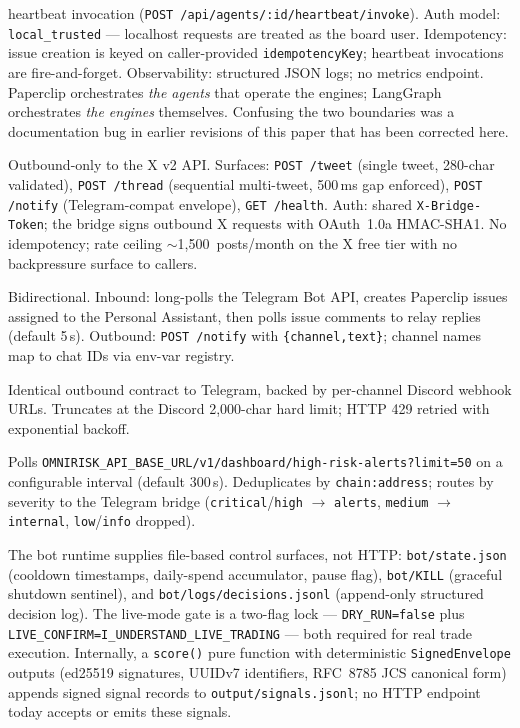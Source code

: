 \documentclass[11pt,a4paper]{article}
\begin{document}
\begin{description}
        heartbeat invocation (\texttt{POST /api/agents/:id/heartbeat/invoke}).
        Auth model: \texttt{local\_trusted} --- localhost requests are
        treated as the board user. Idempotency: issue creation is keyed
        on caller-provided \texttt{idempotencyKey}; heartbeat invocations
        are fire-and-forget. Observability: structured JSON logs; no
        metrics endpoint. Paperclip orchestrates \emph{the agents} that
        operate the engines; LangGraph orchestrates \emph{the engines}
        themselves. Confusing the two boundaries was a documentation bug
        in earlier revisions of this paper that has been corrected here.
  \item[X bridge (\texttt{:8790}).] Outbound-only to the X v2 API. Surfaces:
        \texttt{POST /tweet} (single tweet, 280-char validated), \texttt{POST /thread}
        (sequential multi-tweet, 500\,ms gap enforced), \texttt{POST /notify}
        (Telegram-compat envelope), \texttt{GET /health}. Auth: shared
        \texttt{X-Bridge-Token}; the bridge signs outbound X requests with OAuth~1.0a
        HMAC-SHA1. No idempotency; rate ceiling $\sim$1{,}500~posts/month on the X
        free tier with no backpressure surface to callers.
  \item[Telegram bridge (\texttt{:8788}).] Bidirectional. Inbound: long-polls the
        Telegram Bot API, creates Paperclip issues assigned to the Personal
        Assistant, then polls issue comments to relay replies (default 5\,s).
        Outbound: \texttt{POST /notify} with \texttt{\{channel,text\}}; channel
        names map to chat IDs via env-var registry.
  \item[Discord bridge (\texttt{:8789}).] Identical outbound contract to Telegram,
        backed by per-channel Discord webhook URLs. Truncates at the Discord
        2{,}000-char hard limit; HTTP 429 retried with exponential backoff.
  \item[Risk-alert poller (client; no inbound port).] Polls
        \texttt{OMNIRISK\_API\_BASE\_URL/v1/dashboard/high-risk-alerts?limit=50}
        on a configurable interval (default 300\,s). Deduplicates by
        \texttt{chain:address}; routes by severity to the Telegram bridge
        (\texttt{critical}/\texttt{high} $\to$ \texttt{alerts}, \texttt{medium}
        $\to$ \texttt{internal}, \texttt{low}/\texttt{info} dropped).
\end{description}

The bot runtime supplies file-based control surfaces, not HTTP: \texttt{bot/state.json}
(cooldown timestamps, daily-spend accumulator, pause flag), \texttt{bot/KILL} (graceful
shutdown sentinel), and \texttt{bot/logs/decisions.jsonl} (append-only structured
decision log). The live-mode gate is a two-flag lock --- \texttt{DRY\_RUN=false} plus
\texttt{LIVE\_CONFIRM=I\_UNDERSTAND\_LIVE\_TRADING} --- both required for real trade
execution. Internally, a \texttt{score()} pure function with deterministic
\texttt{SignedEnvelope} outputs (ed25519 signatures, UUIDv7 identifiers, RFC~8785
JCS canonical form) appends signed signal records to \texttt{output/signals.jsonl};
no HTTP endpoint today accepts or emits these signals.
\end{document}

